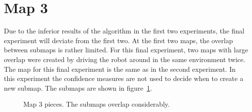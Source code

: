 \section{Map 3}

Due to the inferior results of the algorithm in the first two experiments, the final experiment will deviate from the first two. At the first two maps, the overlap between submaps is rather limited. For this final experiment, two maps with large overlap were created by driving the robot around in the same environment twice. The map for this final experiment is the same as in the second experiment. In this experiment the confidence measures are not used to decide when to create a new submap. The submaps are shown in figure~\ref{fig:map4-parts}. 

\begin{figure}[ht]
  \centering
  \caption{Map 3 pieces. The submaps overlap considerably. }
  \label{fig:map4-parts}
\end{figure}

